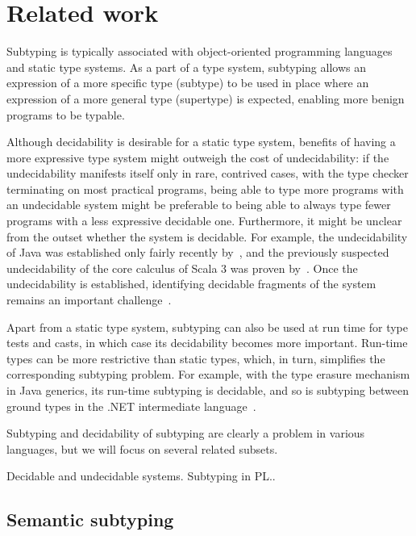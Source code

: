 \chapter{Related work}\label{chap:5}

Subtyping is typically associated with object-oriented programming languages and
static type systems. As a part of a type system, subtyping allows
an expression of a more specific type (subtype) to be used in place
where an expression of a more general type (supertype) is expected,
enabling more benign programs to be typable.

Although decidability is desirable for a static type system,
benefits of having a more expressive type system might outweigh the cost of
undecidability: if the undecidability manifests itself only in rare,
contrived cases, with the type checker terminating on most practical programs,
being able to type more programs with an undecidable system might be preferable
to being able to always type fewer programs with a less expressive decidable one.
Furthermore, it might be unclear from the outset whether
the system is decidable. For example, the undecidability of Java was 
established only fairly recently by~\citet{grigore:java-undec:2017},
and the previously suspected undecidability of the core calculus of Scala 3
was proven by~\citet{hu:dot-undec:2020}.
Once the undecidability is established, identifying decidable fragments of
the system remains an important challenge~\cite{mackay:path-dep-dec:2020,
hu:dot-undec:2020,mackay:bound-poly-sub-dec:2020,kennedy:nom-sub-var-dec:2007}.

Apart from a static type system,
subtyping can also be used at run time for type tests and casts,
in which case its decidability becomes more important.
Run-time types can be more restrictive than static types, which, in turn,
simplifies the corresponding subtyping problem.
For example, with the type erasure mechanism in Java generics,
its run-time subtyping is decidable,
and so is subtyping between ground types in the .NET intermediate
language~\cite{kennedy:nom-sub-var-dec:2007}.




Subtyping and decidability of subtyping are clearly a problem in various languages,
but we will focus on several related subsets.

Decidable and undecidable systems. Subtyping in PL..

\section{Semantic subtyping}

